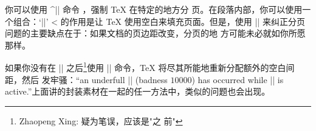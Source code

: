 
你可以使用 ^|\eject| 命令 \ctsref{\eject}，强制 \TeX{} 在特定的地方分
页。在段落内部，你可以使用一个组合：`|\vadjust{\vfill\eject}|' 
\ctsref{\vadjust}
^^| 的作用是让 \TeX{} 使用空白来填充页面。但是，使用
|\eject| 来纠正分页问题的主要缺点在于：如果文档的页边距改变，分页的地
方可能未必就如你所愿那样。


如果你没有在 |\eject| 之后\footnote{Zhaopeng Xing: 疑为笔误，应该是"之
  前"}使用 |\vfill| 命令，\TeX{} 将尽其所能地重新分配额外的空白间距，然后
发牢骚：“an underfull |\vbox| (badness $10000$) has occurred while |\output| is
 active.”上面讲的封装素材在一起的任一方法中，类似的问题也会出现。


